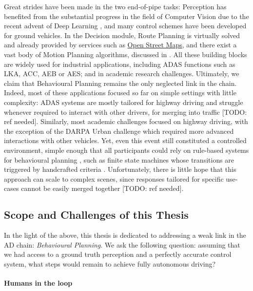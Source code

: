Great strides have been made in the two end-of-pipe tasks: Perception has benefited from the substantial progress in the field of Computer Vision due to the recent advent of Deep Learning \citep[surveyed in][]{janai2017computer}, and many control schemes \citep[surveyed in][]{Polack2018} have been developed for ground vehicles. In the Decision module, Route Planning is virtually solved and already provided by services such as \href{https://wiki.openstreetmap.org/wiki/Routing}{Open Street Maps}, and there exist a vast body of Motion Planning algorithms, discussed in . All these building blocks are widely used for industrial applications, including \gls{ADAS} functions such as \gls{LKA}, \gls{ACC}, \gls{AEB} or \gls{AES}; and in academic research challenges. Ultimately, we claim that Behavioural Planning remains the only neglected link in the chain. Indeed, most of these applications focused so far on simple settings with little complexity: \gls{ADAS} systems are mostly tailored for highway driving and struggle whenever required to interact with other drivers, \eg for merging into traffic [TODO: ref needed]. Similarly, most academic challenges focused on highway driving, with the exception of the DARPA Urban challenge which required more advanced interactions with other vehicles. Yet, even this event still constituted a controlled environment, simple enough that all participants could rely on rule-based systems for behavioural planning \citep{Buehler2009}, such as finite state machines whose transitions are triggered by handcrafted criteria \citep[\eg][]{Baker2008}. Unfortunately, there is little hope that this approach can scale to complex scenes, since responses tailored for specific use-cases cannot be easily merged together [TODO: ref needed].

\subsection{Scope and Challenges of this Thesis}
\label{sec:scopes-and-challenges}

In the light of the above, this thesis is dedicated to addressing a weak link in the \gls{AD} chain: \emph{Behavioural Planning}.  We ask the following question: assuming that we had access to a ground truth perception and a perfectly accurate control system, what steps would remain to achieve fully autonomous driving?


\paragraph{Humans in the loop}

